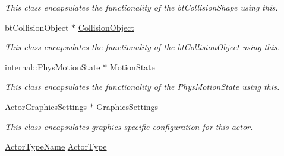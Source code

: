 \begin{DoxyCompactItemize}
\begin{DoxyCompactList}\small\item\em This class encapsulates the functionality of the btCollisionShape using this. \item\end{DoxyCompactList}\item 
\hypertarget{classphys_1_1ActorBase_a70676c52ffee64705a7b463d29b60429}{
btCollisionObject $\ast$ \hyperlink{classphys_1_1ActorBase_a70676c52ffee64705a7b463d29b60429}{CollisionObject}}
\label{d8/d0f/classphys_1_1ActorBase_a70676c52ffee64705a7b463d29b60429}

\begin{DoxyCompactList}\small\item\em This class encapsulates the functionality of the btCollisionObject using this. \item\end{DoxyCompactList}\item 
\hypertarget{classphys_1_1ActorBase_ab776527aa927b8787313c50530cc24ba}{
internal::PhysMotionState $\ast$ \hyperlink{classphys_1_1ActorBase_ab776527aa927b8787313c50530cc24ba}{MotionState}}
\label{d8/d0f/classphys_1_1ActorBase_ab776527aa927b8787313c50530cc24ba}

\begin{DoxyCompactList}\small\item\em This class encapsulates the functionality of the PhysMotionState using this. \item\end{DoxyCompactList}\item 
\hypertarget{classphys_1_1ActorBase_acc34ec92179b9ebe392bb0ae98ce5d3a}{
\hyperlink{classphys_1_1ActorGraphicsSettings}{ActorGraphicsSettings} $\ast$ \hyperlink{classphys_1_1ActorBase_acc34ec92179b9ebe392bb0ae98ce5d3a}{GraphicsSettings}}
\label{d8/d0f/classphys_1_1ActorBase_acc34ec92179b9ebe392bb0ae98ce5d3a}

\begin{DoxyCompactList}\small\item\em This class encapsulates graphics specific configuration for this actor. \item\end{DoxyCompactList}\item 
\hypertarget{classphys_1_1ActorBase_a42baa3657656300eeefe3ed48f526a00}{
\hyperlink{classphys_1_1ActorBase_aff3a7c464e8ce82576073f8f891434b7}{ActorTypeName} \hyperlink{classphys_1_1ActorBase_a42baa3657656300eeefe3ed48f526a00}{ActorType}}
\label{d8/d0f/classphys_1_1ActorBase_a42baa3657656300eeefe3ed48f526a00}


\end{DoxyCompactItemize}
